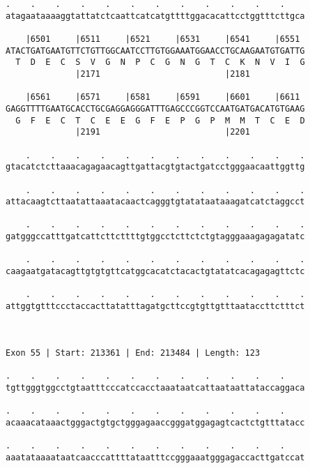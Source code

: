 \documentclass{article}
\begin{document}
\begin{Verbatim}
.    .    .    .    .    .    .    .    .    .    .    .    
atagaataaaaggtattatctcaattcatcatgttttggacacattcctggtttcttgca
                                                            
    |6501     |6511     |6521     |6531     |6541     |6551 
ATACTGATGAATGTTCTGTTGGCAATCCTTGTGGAAATGGAACCTGCAAGAATGTGATTG
  T  D  E  C  S  V  G  N  P  C  G  N  G  T  C  K  N  V  I  G
              |2171                         |2181           
  
    |6561     |6571     |6581     |6591     |6601     |6611 
GAGGTTTTGAATGCACCTGCGAGGAGGGATTTGAGCCCGGTCCAATGATGACATGTGAAG
  G  F  E  C  T  C  E  E  G  F  E  P  G  P  M  M  T  C  E  D
              |2191                         |2201           
  
    .    .    .    .    .    .    .    .    .    .    .    .
gtacatctcttaaacagagaacagttgattacgtgtactgatcctgggaacaattggttg
                                                            
    .    .    .    .    .    .    .    .    .    .    .    .
attacaagtcttaatattaaatacaactcagggtgtatataataaagatcatctaggcct
                                                            
    .    .    .    .    .    .    .    .    .    .    .    .
gatgggccatttgatcattcttcttttgtggcctcttctctgtagggaaagagagatatc
                                                            
    .    .    .    .    .    .    .    .    .    .    .    .
caagaatgatacagttgtgtgttcatggcacatctacactgtatatcacagagagttctc
                                                            
    .    .    .    .    .    .    .    .    .    .    .    .
attggtgtttccctaccacttatatttagatgcttccgtgttgtttaataccttctttct
                                                            
                                                            
 
Exon 55 | Start: 213361 | End: 213484 | Length: 123
 
.    .    .    .    .    .    .    .    .    .    .    .    
tgttgggtggcctgtaatttcccatccacctaaataatcattaataattataccaggaca
                                                            
.    .    .    .    .    .    .    .    .    .    .    .    
acaaacataaactgggactgtgctgggagaaccgggatggagagtcactctgtttatacc
                                                            
.    .    .    .    .    .    .    .    .    .    .    .    
aaatataaaataatcaacccattttataatttccgggaaatgggagaccacttgatccat
                                                            

\end{Verbatim}
\end{document}
